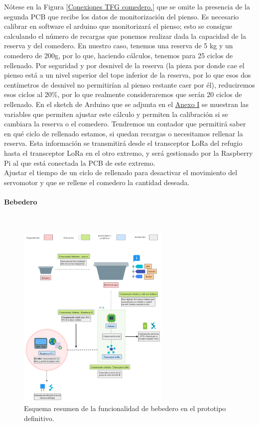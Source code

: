 \documentclass[12pt]{article}
\newcommand{\subsubsubsection}[1]{\paragraph{#1}\mbox{}\\}
\begin{document}
	\noindent Nótese en la Figura \ref{Conexiones TFG comedero.} que se omite la presencia de la segunda PCB que recibe los datos de monitorización del pienso.  Es necesario calibrar en software el arduino que monitorizará el pienso; esto se consigue calculando el número de recargas que ponemos realizar dada la capacidad de la reserva y del comedero. En nuestro caso, tenemos una reserva de 5 kg y un comedero de 200g, por lo que, haciendo cálculos, tenemos para 25 ciclos de rellenado. Por seguridad y por desnivel de la reserva (la pieza por donde cae el pienso está a un nivel superior del tope inferior de la reserva, por lo que esos dos centímetros de desnivel no permitirían al pienso restante caer por él), reduciremos esos ciclos al 20\%, por lo que realmente consideraremos que serán 20 ciclos de rellenado. En el sketch de Arduino que se adjunta en el \hyperref[anexo I: ficha tecnica]{Anexo I} se muestran las variables que permiten ajustar este cálculo y permiten la calibración si se cambiara la reserva o el comedero. Tendremos un contador que permitirá saber en qué ciclo de rellenado estamos, si quedan recargas o necesitamos rellenar la reserva. Esta información se transmitirá desde el transceptor LoRa del refugio hasta el transceptor LoRa en el otro extremo, y será gestionado por la Raspberry Pi al que está conectada la PCB de este extremo.\\ 
	
	\noindent Ajustar el tiempo de un ciclo de rellenado para desactivar el movimiento del servomotor y que se rellene el comedero la cantidad deseada. \\
	
	\pagebreak
	
	\subsubsubsection{Bebedero}
	\begin{figure}[h!]
		\begin{center}
			\includegraphics[width=0.65\textwidth]{img/conexiones tfg-bebedero.png}
			\caption{Esquema resumen de la funcionalidad de bebedero en el prototipo definitivo.}
			\label{Conexiones TFG bebedero.}
		\end{center}
	\end{figure}
	
\end{document}
